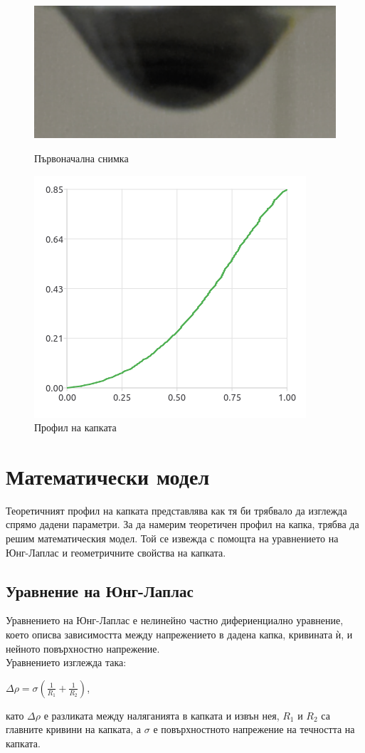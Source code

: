 \documentclass{article}
\begin{document}
\begin{figure}[H]
\centering
\begin{minipage}{0.5\textwidth}
  \centering
  \includegraphics[width=0.5\linewidth]{pendant_real_deal_2.png}
  \caption{Първоначална снимка}
\end{minipage}%
\begin{minipage}{0.5\textwidth}
  \centering
  \includegraphics[width=0.6\linewidth]{l.png}
  \caption{Профил на капката}
\end{minipage}
\end{figure}
\section{Математически модел}
Теоретичният профил на капката представлява как тя би трябвало да изглежда спрямо дадени параметри. За да намерим теоретичен профил на капка, трябва да решим математическия модел. Той се извежда с помощта на уравнението на Юнг-Лаплас и геометричните свойства на капката.
\subsection{Уравнение на Юнг-Лаплас}
\normalsize
Уравнението на Юнг-Лаплас е нелинейно частно дифериенциално уравнение, което описва зависимостта между напрежението в дадена капка, кривината ѝ, и нейното повърхностно напрежение.\\
Уравнението изглежда така:
\begin{center}
$\Delta \rho = \sigma ( \frac {1}{R_1} + \frac {1}{R_2}) $,
\end{center}
като $\Delta \rho$ е разликата между наляганията в капката и извън нея,
${R_1}$ и ${R_2}$ са главните кривини на капката, а $\sigma$ е повърхностното напрежение на течността на капката.
\end{document}
